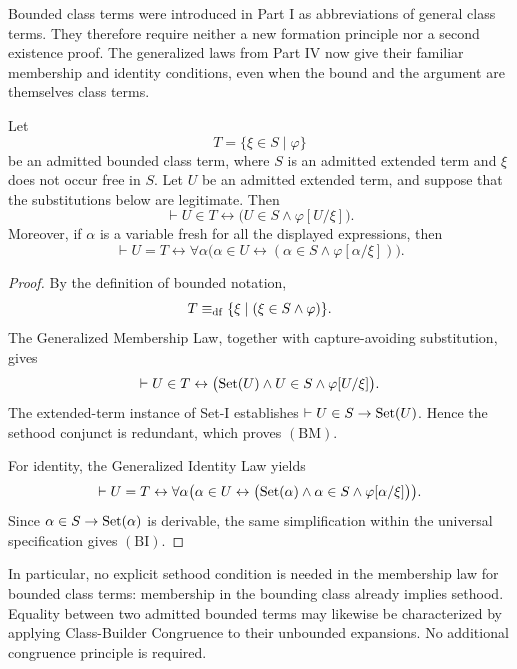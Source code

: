 
Bounded class terms were introduced in Part I as abbreviations of
general class terms. They therefore require neither a new formation
principle nor a second existence proof. The generalized laws from
Part IV now give their familiar membership and identity conditions,
even when the bound and the argument are themselves class terms.

\begin{metatheorem}
\label{meta:generalized-bounded-builder-laws}
Let
\[
T=\{\xi\in S\mid\varphi\}
\]
be an admitted bounded class term, where \(S\) is an admitted
extended term and \(\xi\) does not occur free in \(S\). Let \(U\)
be an admitted extended term, and suppose that the substitutions
below are legitimate. Then
\[
\vdash
U\in T
\leftrightarrow
\bigl(U\in S\land\varphi[U/\xi]\bigr).
\tag{BM}
\]
Moreover, if \(\alpha\) is a variable fresh for all the displayed
expressions, then
\[
\vdash
U=T
\leftrightarrow
\forall\alpha\bigl(
\alpha\in U
\leftrightarrow
(\alpha\in S\land\varphi[\alpha/\xi])
\bigr).
\tag{BI}
\]
\end{metatheorem}

\begin{proof}
By the definition of bounded notation,
\[
T\mathrel{\equiv_{\mathrm{df}}}\{\xi\mid(\xi\in S\land\varphi)\}.
\]
The Generalized Membership Law, together with capture-avoiding
substitution, gives
\[
\vdash
U\in T
\leftrightarrow
\bigl(\operatorname{Set}(U)\land U\in S\land\varphi[U/\xi]\bigr).
\]
The extended-term instance of Set-I establishes
\(\vdash U\in S\to\operatorname{Set}(U)\). Hence the sethood conjunct is
redundant, which proves \((\mathrm{BM})\).

For identity, the Generalized Identity Law yields
\[
\vdash
U=T
\leftrightarrow
\forall\alpha\bigl(
\alpha\in U
\leftrightarrow
\bigl(\operatorname{Set}(\alpha)\land\alpha\in S
\land\varphi[\alpha/\xi]\bigr)
\bigr).
\]
Since \(\alpha\in S\to\operatorname{Set}(\alpha)\) is derivable, the same
simplification within the universal specification gives
\((\mathrm{BI})\).
\end{proof}

In particular, no explicit sethood condition is needed in the
membership law for bounded class terms: membership in the bounding
class already implies sethood. Equality between two admitted bounded
terms may likewise be characterized by applying Class-Builder
Congruence to their unbounded expansions. No additional congruence
principle is required.

